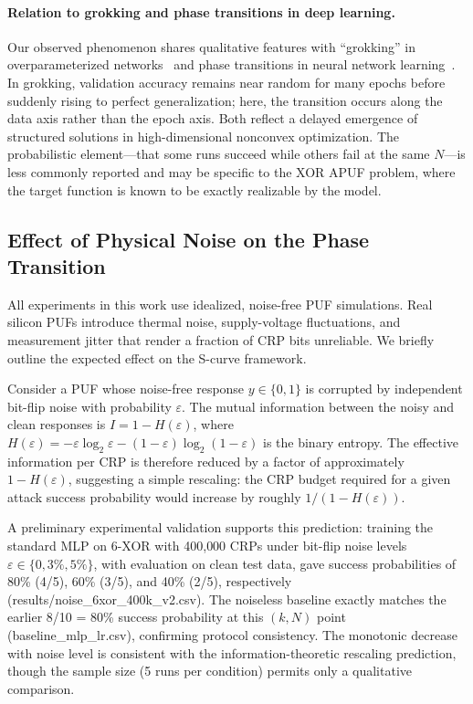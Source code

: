 \paragraph{Relation to grokking and phase transitions in deep learning.}
Our observed phenomenon shares qualitative features with ``grokking'' in
overparameterized networks~\cite{power2022grokking} and phase transitions in
neural network learning~\cite{saxe2014dynamics}.  In grokking, validation
accuracy remains near random for many epochs before suddenly rising to
perfect generalization; here, the transition occurs along the data axis
rather than the epoch axis.  Both reflect a delayed emergence of structured
solutions in high-dimensional nonconvex optimization.  The
probabilistic element---that some runs succeed while others fail at the same
$N$---is less commonly reported and may be specific to the XOR APUF problem,
where the target function is known to be exactly realizable by the model.

\subsection{Effect of Physical Noise on the Phase Transition}

All experiments in this work use idealized, noise-free PUF simulations.
Real silicon PUFs introduce thermal noise, supply-voltage fluctuations, and
measurement jitter that render a fraction of CRP bits unreliable.
We briefly outline the expected effect on the S-curve framework.

Consider a PUF whose noise-free response $y \in \{0,1\}$ is corrupted by
independent bit-flip noise with probability $\varepsilon$.  The mutual
information between the noisy and clean responses is
$I = 1 - H(\varepsilon)$, where $H(\varepsilon) = -\varepsilon\log_2\varepsilon
- (1-\varepsilon)\log_2(1-\varepsilon)$ is the binary entropy.  The effective
information per CRP is therefore reduced by a factor of approximately
$1 - H(\varepsilon)$, suggesting a simple rescaling: the CRP budget
required for a given attack success probability would increase by
roughly $1/(1-H(\varepsilon))$.

A preliminary experimental validation supports this prediction: training
the standard MLP on 6-XOR with 400{,}000 CRPs under bit-flip noise levels
$\varepsilon \in \{0, 3\%, 5\%\}$, with evaluation on clean test data, gave
success probabilities of 80\% (4/5), 60\% (3/5), and 40\% (2/5),
respectively (results/noise\_6xor\_400k\_v2.csv).  The noiseless baseline
exactly matches the earlier 8/10 = 80\% success probability at this $(k, N)$ point
(baseline\_mlp\_lr.csv), confirming protocol consistency.  The monotonic
decrease with noise level is consistent with the information-theoretic
rescaling prediction, though the sample size (5 runs per condition) permits
only a qualitative comparison.

